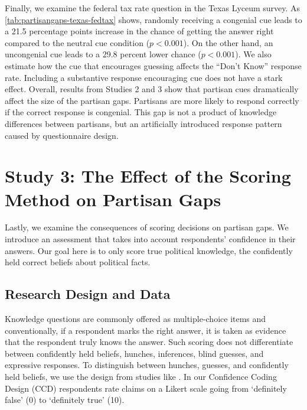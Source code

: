 \documentclass[12pt, letterpaper]{article}
\begin{document}
Finally, we examine the federal tax rate question in the Texas Lyceum survey.  As \cref{tab:partisangaps-texas-fedtax} shows, randomly receiving a congenial cue leads to a 21.5 percentage points increase in the chance of getting the answer right compared to the neutral cue condition ($p<0.001$). On the other hand, an uncongenial cue leads to a 29.8 percent lower chance ($p<0.001$). We also estimate how the cue that encourages guessing affects the ``Don't Know'' response rate. Including a substantive response encouraging cue does not have a stark effect. Overall, results from Studies 2 and 3 show that partisan cues dramatically affect the size of the partisan gaps. Partisans are more likely to respond correctly if the correct response is congenial. This gap is not a product of knowledge differences between partisans, but an artificially introduced response pattern caused by questionnaire design.  

\section*{Study 3: The Effect of the Scoring Method on Partisan Gaps}\label{sec:confidence_coding}

Lastly, we examine the consequences of scoring decisions on partisan gaps. We introduce an assessment that takes into account respondents' confidence in their answers. Our goal here is to only score true political knowledge, the confidently held correct beliefs about political facts. 

\subsection*{Research Design and Data}\label{sec:data3}

Knowledge questions are commonly offered as multiple-choice items and conventionally, if a respondent marks the right answer, it is taken as evidence that the respondent truly knows the answer. Such scoring does not differentiate between confidently held beliefs, hunches, inferences, blind guesses, and expressive responses. To distinguish between hunches, guesses, and confidently held beliefs, we use the design from studies like \citet{pasek2015}. In our Confidence Coding Design (CCD) respondents rate claims on a Likert scale going from `definitely false' (0) to `definitely true' (10). 
\end{document}
